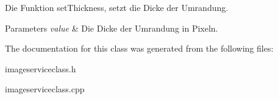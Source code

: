 Die Funktion set\+Thickness, setzt die Dicke der Umrandung. 


\begin{DoxyParams}{Parameters}
{\em value} & Die Dicke der Umrandung in Pixeln. \\
\hline
\end{DoxyParams}


The documentation for this class was generated from the following files\+:\begin{DoxyCompactItemize}
\item 
imageserviceclass.\+h\item 
imageserviceclass.\+cpp\end{DoxyCompactItemize}
